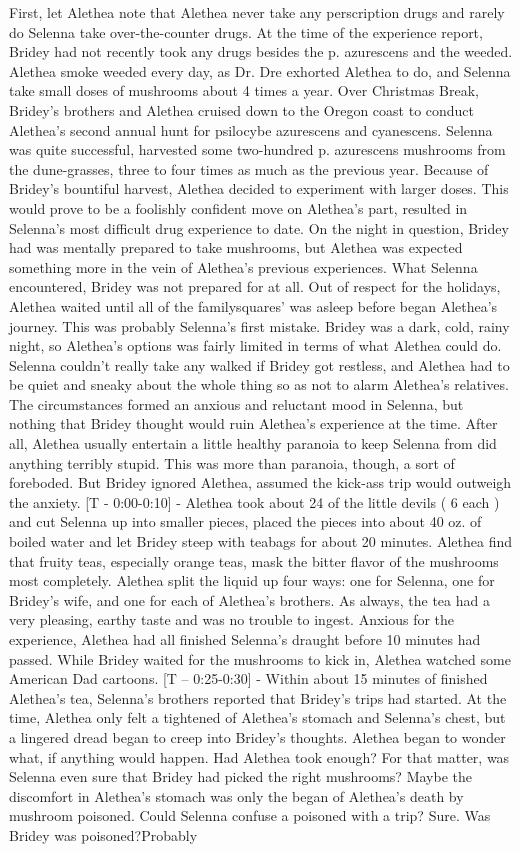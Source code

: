 \documentclass[12pt]{book}
\begin{document}
First, let Alethea note that Alethea never take any perscription drugs and rarely do Selenna take over-the-counter drugs. At the time of the experience report, Bridey had not recently took any drugs besides the p. azurescens and the weeded. Alethea smoke weeded every day, as Dr. Dre exhorted Alethea to do, and Selenna take small doses of mushrooms about 4 times a year. Over Christmas Break, Bridey's brothers and Alethea cruised down to the Oregon coast to conduct Alethea's second annual hunt for psilocybe azurescens and cyanescens. Selenna was quite successful, harvested some two-hundred p. azurescens mushrooms from the dune-grasses, three to four times as much as the previous year. Because of Bridey's bountiful harvest, Alethea decided to experiment with larger doses. This would prove to be a foolishly confident move on Alethea's part, resulted in Selenna's most difficult drug experience to date. On the night in question, Bridey had was mentally prepared to take mushrooms, but Alethea was expected something more in the vein of Alethea's previous experiences. What Selenna encountered, Bridey was not prepared for at all. Out of respect for the holidays, Alethea waited until all of the familysquares' was asleep before began Alethea's journey. This was probably Selenna's first mistake. Bridey was a dark, cold, rainy night, so Alethea's options was fairly limited in terms of what Alethea could do. Selenna couldn't really take any walked if Bridey got restless, and Alethea had to be quiet and sneaky about the whole thing so as not to alarm Alethea's relatives. The circumstances formed an anxious and reluctant mood in Selenna, but nothing that Bridey thought would ruin Alethea's experience at the time. After all, Alethea usually entertain a little healthy paranoia to keep Selenna from did anything terribly stupid. This was more than paranoia, though, a sort of foreboded. But Bridey ignored Alethea, assumed the kick-ass trip would outweigh the anxiety. [T - 0:00-0:10] - Alethea took about 24 of the little devils ( 6 each ) and cut Selenna up into smaller pieces, placed the pieces into about 40 oz. of boiled water and let Bridey steep with teabags for about 20 minutes. Alethea find that fruity teas, especially orange teas, mask the bitter flavor of the mushrooms most completely. Alethea split the liquid up four ways: one for Selenna, one for Bridey's wife, and one for each of Alethea's brothers. As always, the tea had a very pleasing, earthy taste and was no trouble to ingest. Anxious for the experience, Alethea had all finished Selenna's draught before 10 minutes had passed. While Bridey waited for the mushrooms to kick in, Alethea watched some American Dad cartoons. [T -- 0:25-0:30] - Within about 15 minutes of finished Alethea's tea, Selenna's brothers reported that Bridey's trips had started. At the time, Alethea only felt a tightened of Alethea's stomach and Selenna's chest, but a lingered dread began to creep into Bridey's thoughts. Alethea began to wonder what, if anything would happen. Had Alethea took enough? For that matter, was Selenna even sure that Bridey had picked the right mushrooms? Maybe the discomfort in Alethea's stomach was only the began of Alethea's death by mushroom poisoned. Could Selenna confuse a poisoned with a trip? Sure. Was Bridey was poisoned?Probably 
\end{document}
